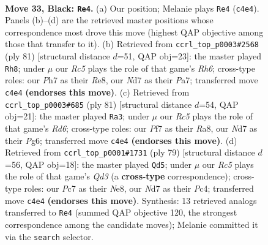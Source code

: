 \documentclass[11pt]{article}
\begin{document}
\clearpage

\begin{figure}[p]\centering
\begin{subfigure}{0.46\textwidth}\centering
\resizebox{\linewidth}{!}{%
\newchessgame
\chessboard[
  setfen={2Q5/2pnkp1p/8/3p2N1/2r2P2/8/6P1/R3R1K1 b - - 2 33},
  showmover=false,
  pgfstyle=straightmove, color=movearrow, markmove={c4-e4}
]}
\caption{}
\end{subfigure}\hfill
\begin{subfigure}{0.46\textwidth}\centering
\resizebox{\linewidth}{!}{%
\newchessgame
\chessboard[
  setfen={4rk2/p4p2/8/8/4N3/5P1r/nP1R2Kp/7R b - - 1 41},
  showmover=false,
  pgfstyle=straightmove, color=movearrow, markmove={h3-h8}
]}
\caption{}
\end{subfigure}
\\[4pt]
\begin{subfigure}{0.46\textwidth}\centering
\resizebox{\linewidth}{!}{%
\newchessgame
\chessboard[
  setfen={r5k1/5p2/6p1/P1N5/8/3rn1R1/7P/2R3K1 b - - 5 41},
  showmover=false,
  pgfstyle=straightmove, color=movearrow, markmove={d3-a3}
]}
\caption{}
\end{subfigure}\hfill
\begin{subfigure}{0.46\textwidth}\centering
\resizebox{\linewidth}{!}{%
\newchessgame
\chessboard[
  setfen={2Q1nk2/5p2/3q4/1p6/2pN4/4P3/r4PP1/2R3K1 b - - 1 40},
  showmover=false,
  pgfstyle=straightmove, color=movearrow, markmove={d6-d5}
]}
\caption{}
\end{subfigure}
\caption{\textbf{Move 33, Black: \texttt{Re4}.} (a) Our position; Melanie plays \texttt{Re4} (\texttt{c4e4}). Panels (b)--(d) are the retrieved master positions whose correspondence most drove this move (highest QAP objective among those that transfer to it). (b) Retrieved from \texttt{ccrl\_top\_p0003\#2568} (ply 81) [structural distance $d$=51, QAP obj=23]: the master played \texttt{Rh8}; under $\mu$ our \emph{Rc5} plays the role of that game's \emph{Rh6}; cross-type roles: our \emph{P}h7 as their \emph{R}e8, our \emph{N}d7 as their \emph{P}a7; transferred move \texttt{c4e4} \textbf{(endorses this move)}. (c) Retrieved from \texttt{ccrl\_top\_p0003\#685} (ply 81) [structural distance $d$=54, QAP obj=21]: the master played \texttt{Ra3}; under $\mu$ our \emph{Rc5} plays the role of that game's \emph{Rd6}; cross-type roles: our \emph{P}f7 as their \emph{R}a8, our \emph{N}d7 as their \emph{P}g6; transferred move \texttt{c4e4} \textbf{(endorses this move)}. (d) Retrieved from \texttt{ccrl\_top\_p0001\#1731} (ply 79) [structural distance $d$=56, QAP obj=18]: the master played \texttt{Qd5}; under $\mu$ our \emph{Rc5} plays the role of that game's \emph{Qd3} (a \textbf{cross-type} correspondence); cross-type roles: our \emph{P}c7 as their \emph{N}e8, our \emph{N}d7 as their \emph{P}c4; transferred move \texttt{c4e4} \textbf{(endorses this move)}. Synthesis: 13 retrieved analogs transferred to \texttt{Re4} (summed QAP objective 120, the strongest correspondence among the candidate moves); Melanie committed it via the \texttt{search} selector.}
\label{fig:thought-m65}
\end{figure}
\end{document}
